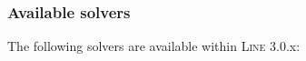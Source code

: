 \subsubsection{Available solvers}
\noindent The following  solvers are available within \textsc{Line} 3.0.x:
